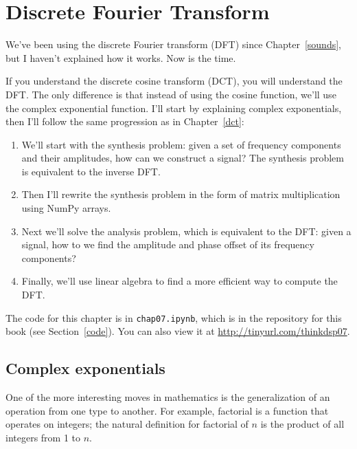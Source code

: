 \chapter{Discrete Fourier Transform}
\label{dft}

We've been using the discrete Fourier transform (DFT) since
Chapter~\ref{sounds}, but I haven't explained how it works.  Now is
the time.

If you understand the discrete cosine transform (DCT), you will
understand the DFT.  The only difference is that instead of using the
cosine function, we'll use the complex exponential function.  I'll
start by explaining complex exponentials, then I'll follow the
same progression as in Chapter~\ref{dct}:

\begin{enumerate}
	
	\item We'll start with the synthesis
	problem: given a set of frequency components and their amplitudes,
	how can we construct a signal?  The synthesis problem is
	equivalent to the inverse DFT.
	
	\item Then I'll rewrite the synthesis problem in the form of matrix
	multiplication using NumPy arrays.
	
	\item Next we'll solve the analysis problem, which is equivalent to
	the DFT: given a signal, how to we find the amplitude and phase
	offset of its frequency components?
	
	\item Finally, we'll use linear algebra to find a more efficient way
	to compute the DFT.
	
\end{enumerate}

The code for this chapter is in {\tt chap07.ipynb}, which is in the
repository for this book (see Section~\ref{code}).
You can also view it at \url{http://tinyurl.com/thinkdsp07}.


\section{Complex exponentials}

One of the more interesting moves in mathematics is the generalization
of an operation from one type to another.  For example, factorial is a
function that operates on integers; the natural definition for
factorial of $n$ is the product of all integers from 1 to $n$.

